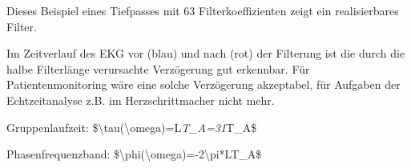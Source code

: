 \documentclass[a4paper]{article}
\begin{document}
\begin{multicols}{3}
  \begin{itemize*}
    \item Dieses Beispiel eines Tiefpasses mit 63 Filterkoeffizienten zeigt ein realisierbares Filter.
    \item Im Zeitverlauf des EKG vor (blau) und nach (rot) der Filterung ist die durch die halbe Filterlänge verursachte Verzögerung gut erkennbar. Für Patientenmonitoring wäre eine solche Verzögerung akzeptabel, für Aufgaben der Echtzeitanalyse z.B. im Herzschrittmacher nicht mehr.
    \item Gruppenlaufzeit: \$\textbackslash tau(\textbackslash omega)=L\emph{T\_A=31}T\_A\$
    \item Phasenfrequenzband: \$\textbackslash phi(\textbackslash omega)=-2\textbackslash pi*LT\_A\$
  \end{itemize*}



\end{multicols}
\end{document}

